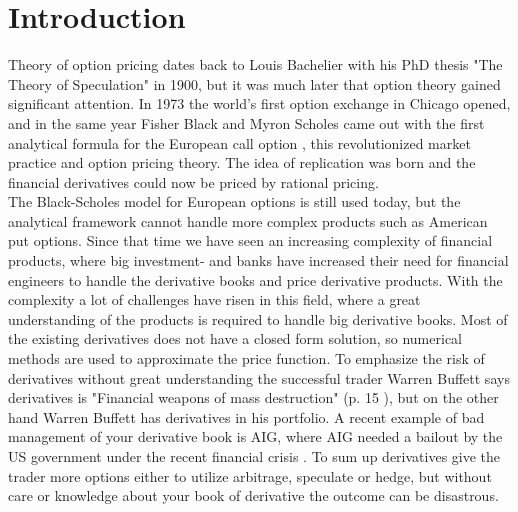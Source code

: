 
\chapter{Introduction} %

\label{Chapter1} %

Theory of option pricing dates back to Louis Bachelier with his PhD thesis "The Theory of Speculation" in 1900, but it was much later that option theory gained significant attention. In 1973 the world's first option exchange in Chicago opened, and in the same year Fisher Black and Myron Scholes came out with the first analytical formula for the European call option \parencite{B-S-Paper}, this revolutionized market practice and option pricing theory. The idea of replication was born and the financial derivatives could now be priced by rational pricing. \\

The Black-Scholes model for European options is still used today, but the analytical framework cannot handle more complex products such as American put options. Since that time we have seen an increasing complexity of financial products, where big investment- and banks have increased their need for financial engineers to handle the derivative books and price derivative products. With the complexity a lot of challenges have risen in this field, where a great understanding of the products is required to handle big derivative books. Most of the existing derivatives does not have a closed form solution, so numerical methods are used to approximate the price function. To emphasize the risk of derivatives without great understanding the successful trader Warren Buffett says derivatives is "Financial weapons of mass destruction" (p. 15 \parencite{Buffett02}), but on the other hand Warren Buffett has derivatives in his portfolio. A recent example of bad management of your derivative book is AIG, where AIG needed a bailout by the US government under the recent financial crisis \parencite{McDonaldRobert2015}. To sum up derivatives give the trader more options either to utilize arbitrage, speculate or hedge, but without care or knowledge about your book of derivative the outcome can be disastrous.\\

